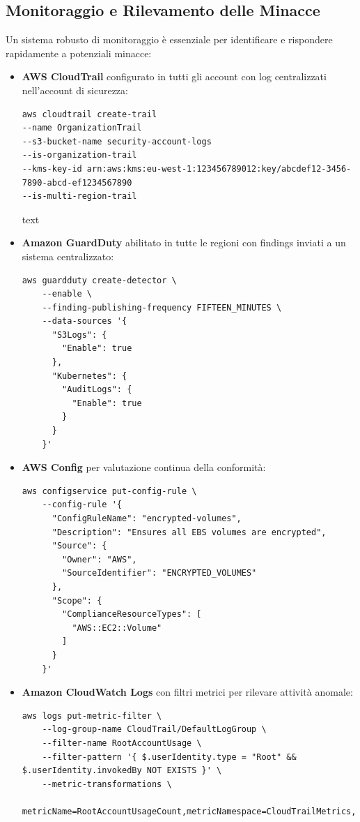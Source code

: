 \documentclass[a4paper,12pt]{report}
\begin{document}
\subsection{Monitoraggio e Rilevamento delle Minacce}

Un sistema robusto di monitoraggio è essenziale per identificare e rispondere rapidamente a potenziali minacce:

\begin{itemize}
\item \textbf{AWS CloudTrail} configurato in tutti gli account con log centralizzati nell'account di sicurezza:
\begin{verbatim}
aws cloudtrail create-trail
--name OrganizationTrail
--s3-bucket-name security-account-logs
--is-organization-trail
--kms-key-id arn:aws:kms:eu-west-1:123456789012:key/abcdef12-3456-7890-abcd-ef1234567890
--is-multi-region-trail
\end{verbatim}

text
\item \textbf{Amazon GuardDuty} abilitato in tutte le regioni con findings inviati a un sistema centralizzato:
\begin{verbatim}
aws guardduty create-detector \
    --enable \
    --finding-publishing-frequency FIFTEEN_MINUTES \
    --data-sources '{
      "S3Logs": {
        "Enable": true
      },
      "Kubernetes": {
        "AuditLogs": {
          "Enable": true
        }
      }
    }'
\end{verbatim}

\item \textbf{AWS Config} per valutazione continua della conformità:
\begin{verbatim}
aws configservice put-config-rule \
    --config-rule '{
      "ConfigRuleName": "encrypted-volumes",
      "Description": "Ensures all EBS volumes are encrypted",
      "Source": {
        "Owner": "AWS",
        "SourceIdentifier": "ENCRYPTED_VOLUMES"
      },
      "Scope": {
        "ComplianceResourceTypes": [
          "AWS::EC2::Volume"
        ]
      }
    }'
\end{verbatim}

\item \textbf{Amazon CloudWatch Logs} con filtri metrici per rilevare attività anomale:
\begin{verbatim}
aws logs put-metric-filter \
    --log-group-name CloudTrail/DefaultLogGroup \
    --filter-name RootAccountUsage \
    --filter-pattern '{ $.userIdentity.type = "Root" && $.userIdentity.invokedBy NOT EXISTS }' \
    --metric-transformations \
        metricName=RootAccountUsageCount,metricNamespace=CloudTrailMetrics,metricValue=1
\end{verbatim}
\end{itemize}
\end{document}
